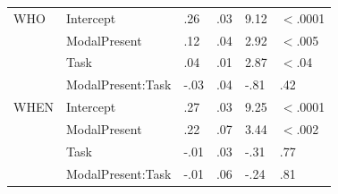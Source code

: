 \documentclass[12pt,letterpaper,table,svgnames,dvipsnames]{article}
\begin{document}
\begin{table}
\begin{center}
\begin{tabular}{llllll}
WHO & Intercept & .26 & .03 & 9.12 & $<$.0001\\
{} & ModalPresent & .12 & .04 & 2.92 & $<$.005\\
{} & Task & .04 & .01 & 2.87 & $<$.04\\
{} & ModalPresent:Task & -.03 & .04 & -.81 & .42\\
\midrule
WHEN & Intercept & .27 & .03 & 9.25 & $<$.0001\\
{} & ModalPresent & .22 & .07 & 3.44 & $<$.002\\
{} & Task & -.01 & .03 & -.31 & .77\\
{} & ModalPresent:Task & -.01 & .06 & -.24 & .81\\
\bottomrule
\end{tabular} 
\end{center} 
\end{table}
\end{document}
